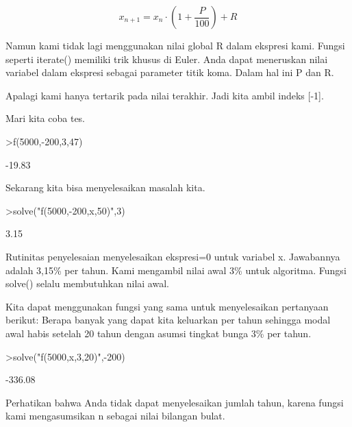 \documentclass{article}
\begin{document}
\begin{eulernotebook}
\begin{eulercomment}
\begin{eulercomment}
\begin{eulercomment}
\begin{eulercomment}
\begin{eulercomment}
\begin{eulercomment}
\begin{eulercomment}
\begin{eulercomment}
\begin{eulercomment}
\begin{eulercomment}
\begin{eulercomment}
\end{eulercomment}
\begin{eulerformula}
\[
x_{n+1} = x_n \cdot \left(1+ \frac{P}{100}\right) + R
\]
\end{eulerformula}
\begin{eulercomment}
Namun kami tidak lagi menggunakan nilai global R dalam ekspresi kami.
Fungsi seperti iterate() memiliki trik khusus di Euler. Anda dapat
meneruskan nilai variabel dalam ekspresi sebagai parameter titik koma.
Dalam hal ini P dan R.


Apalagi kami hanya tertarik pada nilai terakhir. Jadi kita ambil
indeks [-1].


Mari kita coba tes.
\end{eulercomment}
\begin{eulerprompt}
>f(5000,-200,3,47)
\end{eulerprompt}
\begin{euleroutput}
       -19.83 
\end{euleroutput}
\begin{eulercomment}
Sekarang kita bisa menyelesaikan masalah kita.
\end{eulercomment}
\begin{eulerprompt}
>solve("f(5000,-200,x,50)",3)
\end{eulerprompt}
\begin{euleroutput}
         3.15 
\end{euleroutput}
\begin{eulercomment}
Rutinitas penyelesaian menyelesaikan ekspresi=0 untuk variabel x.
Jawabannya adalah 3,15\% per tahun. Kami mengambil nilai awal 3\% untuk
algoritma. Fungsi solve() selalu membutuhkan nilai awal.

Kita dapat menggunakan fungsi yang sama untuk menyelesaikan pertanyaan
berikut: Berapa banyak yang dapat kita keluarkan per tahun sehingga
modal awal habis setelah 20 tahun dengan asumsi tingkat bunga 3\% per
tahun.
\end{eulercomment}
\begin{eulerprompt}
>solve("f(5000,x,3,20)",-200)
\end{eulerprompt}
\begin{euleroutput}
      -336.08 
\end{euleroutput}
\begin{eulercomment}
Perhatikan bahwa Anda tidak dapat menyelesaikan jumlah tahun, karena
fungsi kami mengasumsikan n sebagai nilai bilangan bulat.


\end{eulercomment}
\end{eulercomment}
\end{eulercomment}
\end{eulercomment}
\end{eulercomment}
\end{eulercomment}
\end{eulercomment}
\end{eulercomment}
\end{eulercomment}
\end{eulercomment}
\end{eulercomment}
\end{eulernotebook}
\end{document}
